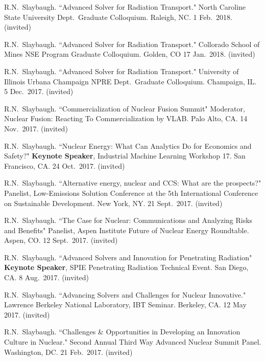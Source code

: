 \begin{bibsection}
\item R.N.\ Slaybaugh.  ``Advanced Solver for Radiation Transport." North Caroline State University Dept.\ Graduate Colloquium. Raleigh, NC. 1 Feb.\ 2018. (invited)

\item R.N.\ Slaybaugh.  ``Advanced Solver for Radiation Transport." Collorado School of Mines NSE Program Graduate Colloquium. Golden, CO 17 Jan.\ 2018. (invited)

\item R.N.\ Slaybaugh.  ``Advanced Solver for Radiation Transport." University of Illinois Urbana Champaign NPRE Dept.\ Graduate Colloquium. Champaign, IL. 5 Dec.\ 2017. (invited)

\item R.N.\ Slaybaugh. ``Commercialization of  Nuclear Fusion Summit" Moderator, Nuclear Fusion: Reacting To Commercialization by VLAB. Palo Alto, CA. 14 Nov.\ 2017. (invited)

\item R.N.\ Slaybaugh. ``Nuclear Energy: What Can Analytics Do for Economics and Safety?" \textbf{Keynote Speaker}, Industrial Machine Learning Workshop 17. San Francisco, CA. 24 Oct.\ 2017. (invited)

\item R.N.\ Slaybaugh. ``Alternative energy, nuclear and CCS: What are the prospects?" Panelist, Low-Emissions Solution Conference at the 5th International Conference on Sustainable Development. New York, NY. 21  Sept.\ 2017. (invited)

\item R.N.\ Slaybaugh. ``The Case for Nuclear: Communications and Analyzing Risks and Benefits" Panelist, Aspen Institute Future of Nuclear Energy Roundtable. Aspen, CO. 12  Sept.\ 2017. (invited)

\item R.N.\ Slaybaugh. ``Advanced Solvers and Innovation for Penetrating Radiation" \textbf{Keynote Speaker}, SPIE Penetrating Radiation Technical Event. San Diego, CA. 8 Aug.\ 2017. (invited)

\item R.N.\ Slaybaugh. ``Advancing Solvers and Challenges for Nuclear Innovative." Lawrence Berkeley National Laboratory, IBT Seminar. Berkeley, CA. 12 May 2017. (invited)

\item R.N.\ Slaybaugh. ``Challenges \& Opportunities in Developing an Innovation Culture in Nuclear." Second Annual Third Way Advanced Nuclear Summit Panel. Washington, DC. 21 Feb.\ 2017. (invited)


\end{bibsection}
